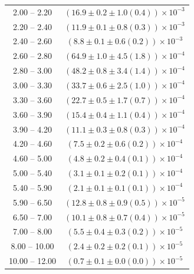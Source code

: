 \begin{table}
\begin{center}
\begin{tabular}{ c | c }
2.00 -- 2.20 & $(16.9\pm0.2\pm1.0(0.4))\times10^{-3}$ \\ 
2.20 -- 2.40 & $(11.9\pm0.1\pm0.8(0.3))\times10^{-3}$ \\ 
2.40 -- 2.60 & $(8.8\pm0.1\pm0.6(0.2))\times10^{-3}$ \\ 
2.60 -- 2.80 & $(64.9\pm1.0\pm4.5(1.8))\times10^{-4}$ \\ 
2.80 -- 3.00 & $(48.2\pm0.8\pm3.4(1.4))\times10^{-4}$ \\ 
3.00 -- 3.30 & $(33.7\pm0.6\pm2.5(1.0))\times10^{-4}$ \\ 
3.30 -- 3.60 & $(22.7\pm0.5\pm1.7(0.7))\times10^{-4}$ \\ 
3.60 -- 3.90 & $(15.4\pm0.4\pm1.1(0.4))\times10^{-4}$ \\ 
3.90 -- 4.20 & $(11.1\pm0.3\pm0.8(0.3))\times10^{-4}$ \\ 
4.20 -- 4.60 & $(7.5\pm0.2\pm0.6(0.2))\times10^{-4}$ \\ 
4.60 -- 5.00 & $(4.8\pm0.2\pm0.4(0.1))\times10^{-4}$ \\ 
5.00 -- 5.40 & $(3.1\pm0.1\pm0.2(0.1))\times10^{-4}$ \\ 
5.40 -- 5.90 & $(2.1\pm0.1\pm0.1(0.1))\times10^{-4}$ \\ 
5.90 -- 6.50 & $(12.8\pm0.8\pm0.9(0.5))\times10^{-5}$ \\ 
6.50 -- 7.00 & $(10.1\pm0.8\pm0.7(0.4))\times10^{-5}$ \\ 
7.00 -- 8.00 & $(5.5\pm0.4\pm0.3(0.2))\times10^{-5}$ \\ 
8.00 -- 10.00 & $(2.4\pm0.2\pm0.2(0.1))\times10^{-5}$ \\ 
10.00 -- 12.00 & $(0.7\pm0.1\pm0.0(0.0))\times10^{-5}$ \\ 
\hline
\end{tabular}
\end{center}
\end{table}
 
